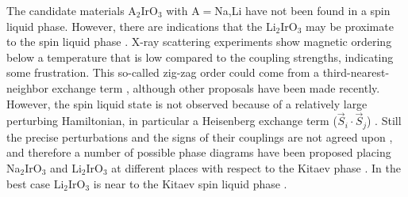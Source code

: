 \documentclass[aps,pra,preprint,groupedaddress]{revtex4-1}
\newcommand{\1}{\mathds{1}}
\begin{document}
The candidate materials A$_2$IrO$_3$ with A$=$Na,Li have not been found in a spin liquid phase. However, there are indications that the Li$_2$IrO$_3$ may be proximate to the spin liquid phase \cite{Kimchi,Singh}. X-ray scattering experiments show magnetic ordering \cite{Gretarsson4} below a temperature that is low compared to the coupling strengths, indicating some frustration. This so-called zig-zag order could come from a third-nearest-neighbor exchange term \cite{Kimchi}, although other proposals have been made recently. However, the spin liquid state is not observed because of a relatively large perturbing Hamiltonian, in particular a Heisenberg exchange term ($\vec{S}_i\cdot \vec{S}_j$) \cite{Jin,Bhattacharjee,Kimchi,Katukuri}. Still the precise perturbations and the signs of their couplings are not agreed upon \cite{Katukuri}, and therefore a number of possible phase diagrams have been proposed placing Na$_2$IrO$_3$ and Li$_2$IrO$_3$ at different places with respect to the Kitaev phase \cite{Katukuri,Kimchi,Jiang2,Reuther,Price}. In the best case Li$_2$IrO$_3$ is near to the Kitaev spin liquid phase \cite{Kimchi,Singh}. 





%
%
%
%








\end{document}
